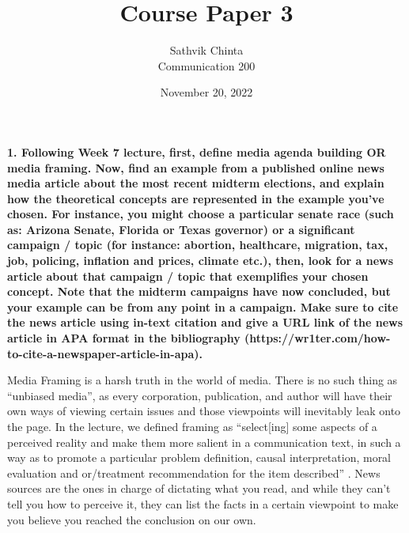 \documentclass[a4paper]{article}
\title {
	Course Paper 3
}
\author {
	\normalsize Sathvik Chinta\\\normalsize
    \normalsize Communication 200\\\normalsize
}
\date {
	\color{black} November 20, 2022
}
\begin{document}
 \maketitle
    \section{}
        \textbf{1. Following Week 7 lecture, first, define media agenda building OR media framing. Now, find an example from a published online news media article about the most recent midterm elections, and explain how the theoretical concepts are represented in the example you’ve chosen. For instance, you might choose a particular senate race (such as: Arizona Senate, Florida or Texas governor) or a significant campaign / topic (for instance: abortion, healthcare, migration, tax, job, policing, inflation and prices, climate etc.), then, look for a news article about that campaign / topic that exemplifies your chosen concept. Note that the midterm campaigns have now concluded, but your example can be from any point in a campaign. Make sure to cite the news article using in-text citation and give a URL link of the news article in APA format in the bibliography (https://wr1ter.com/how-to-cite-a-newspaper-article-in-apa). }

        Media Framing is a harsh truth in the world of media. There is no such thing as “unbiased media”, as every corporation, publication, and author will have their own ways of viewing certain issues and those viewpoints will inevitably leak onto the page. 
        In the lecture, we defined framing as “select[ing] some aspects of a perceived reality and make them more salient in a communication text, in such a way as to promote a particular problem definition, causal interpretation, moral evaluation and or/treatment 
        recommendation for the item described” \citep{lesson7}. News sources are the ones in charge of dictating what you read, and while they can’t tell you how to perceive it, they can list the facts in a certain viewpoint to make you believe you reached the 
        conclusion on our own. 
\end{document}
